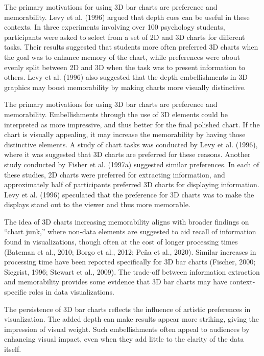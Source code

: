 \documentclass[phd]{nuthesis}
\begin{document}
The primary motivations for using 3D bar charts are preference and
memorability. Levy et al. (1996) argued that depth cues can be useful in
these contexts. In three experiments involving over 100 psychology
students, participants were asked to select from a set of 2D and 3D
charts for different tasks. Their results suggested that students more
often preferred 3D charts when the goal was to enhance memory of the
chart, while preferences were about evenly split between 2D and 3D when
the task was to present information to others. Levy et al. (1996) also
suggested that the depth embellishments in 3D graphics may boost
memorability by making charts more visually distinctive.

The primary motivations for using 3D bar charts are preference and
memorability. Embellishments through the use of 3D elements could be
interpreted as more impressive, and thus better for the final polished
chart. If the chart is visually appealing, it may increase the
memorability by having those distinctive elements. A study of chart
tasks was conducted by Levy et al. (1996), where it was suggested that
3D charts are preferred for these reasons. Another study conducted by
Fisher et al. (1997a) suggested similar preferences. In each of these
studies, 2D charts were preferred for extracting information, and
approximately half of participants preferred 3D charts for displaying
information. Levy et al. (1996) speculated that the preference for 3D
charts was to make the displays stand out to the viewer and thus more
memorable.

The idea of 3D charts increasing memorability aligns with broader
findings on ``chart junk,'' where non-data elements are suggested to aid
recall of information found in visualizations, though often at the cost
of longer processing times (Bateman et al., 2010; Borgo et al., 2012;
Peña et al., 2020). Similar increases in processing time have been
reported specifically for 3D bar charts (Fischer, 2000; Siegrist, 1996;
Stewart et al., 2009). The trade-off between information extraction and
memorability provides some evidence that 3D bar charts may have
context-specific roles in data visualizations.

The persistence of 3D bar charts reflects the influence of artistic
preferences in visualization. The added depth can make results appear
more striking, giving the impression of visual weight. Such
embellishments often appeal to audiences by enhancing visual impact,
even when they add little to the clarity of the data itself.
\end{document}
